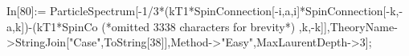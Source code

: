 In[80]:= ParticleSpectrum[-1/3*(kT1*SpinConnection[-i,a,i]*SpinConnection[-k,-a,k])-(kT1*SpinCo (*omitted 3338 characters for brevity*) ,k,-k]],TheoryName->StringJoin["Case",ToString[38]],Method->"Easy",MaxLaurentDepth->3];
